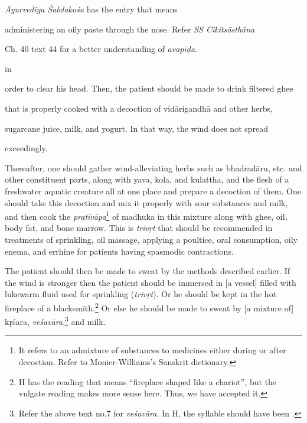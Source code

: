 \begin{translation}
\begin{tt}
{            \textit{Āyurvedīya \'{S}abdakośa} has the entry 
            that means

            administering an oily paste through the nose. Refer \textit{SS
                Cikitsāsthāna}

            Ch. 40 text 44 for a better understanding of
            \textit{avapīḍa}.} in

        order to clear his head. Then, the patient should be made to drink
        filtered ghee

        that is properly cooked with a decoction of \gls{vidārigandhā} and
        other herbs,

        sugarcane juice, milk, and yogurt. In that way, the wind does not
        spread

        exceedingly.



        Thereafter, one should gather wind-alleviating herbs such as
        \gls{bhadradāru}, etc. and other constituent parts, along with \gls{yava},
        \gls{kola}, and \gls{kulattha}, and the flesh of a freshwater aquatic creature all
        at one place and prepare a decoction of them. One should take this decoction
        and mix it properly with sour substances and milk, and then cook the
        \textit{pratīvāpa}\footnote{It refers to an admixture of substances to medicines
            either during or after decoction. Refer to Monier-Williams's Sanskrit dictionary.}
        of \gls{madhuka} in this mixture along with ghee, oil, body fat, and bone
        marrow. This is \textit{trivṛt} that should be recommended in treatments of
        sprinkling, oil massage, applying a poultice, oral consumption, oily enema, and
        errhine for patients having spasmodic contractions.



        The patient should then be made to sweat by the methods
        described earlier. If the wind is stronger then the patient should be immersed in
            [a vessel] filled with lukewarm fluid used for sprinkling (\textit{trivṛt}). Or he
        should be kept in the hot fireplace of a blacksmith.\footnote{H has the reading
             that means \enquote{fireplace shaped like a chariot},
            but the vulgate reading  makes more sense here. Thus,
            we have accepted it.} Or else he should be made to sweat by [a mixture of]
        \gls{kṛśara}, \textit{veśavāra},\footnote{Refer the above text no.7 for
            \textit{veśavāra}. In H, the syllable  should have been .} and
        milk.




\end{tt}
\end{translation}
